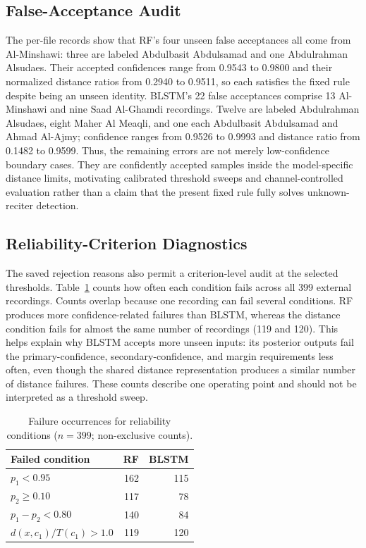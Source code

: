 \documentclass[a4paper,conference]{IEEEtran}
\begin{document}
\subsection{False-Acceptance Audit}

The per-file records show that RF's four unseen false acceptances all come from Al-Minshawi: three are labeled Abdulbasit Abdulsamad and one Abdulrahman Alsudaes. Their accepted confidences range from 0.9543 to 0.9800 and their normalized distance ratios from 0.2940 to 0.9511, so each satisfies the fixed rule despite being an unseen identity. BLSTM's 22 false acceptances comprise 13 Al-Minshawi and nine Saad Al-Ghamdi recordings. Twelve are labeled Abdulrahman Alsudaes, eight Maher Al Meaqli, and one each Abdulbasit Abdulsamad and Ahmad Al-Ajmy; confidence ranges from 0.9526 to 0.9993 and distance ratio from 0.1482 to 0.9599. Thus, the remaining errors are not merely low-confidence boundary cases. They are confidently accepted samples inside the model-specific distance limits, motivating calibrated threshold sweeps and channel-controlled evaluation rather than a claim that the present fixed rule fully solves unknown-reciter detection.

\subsection{Reliability-Criterion Diagnostics}

The saved rejection reasons also permit a criterion-level audit at the selected thresholds. Table~\ref{table_failures} counts how often each condition fails across all 399 external recordings. Counts overlap because one recording can fail several conditions. RF produces more confidence-related failures than BLSTM, whereas the distance condition fails for almost the same number of recordings (119 and 120). This helps explain why BLSTM accepts more unseen inputs: its posterior outputs fail the primary-confidence, secondary-confidence, and margin requirements less often, even though the shared distance representation produces a similar number of distance failures. These counts describe one operating point and should not be interpreted as a threshold sweep.

\begin{table}[htbp]
\centering
\caption{Failure occurrences for reliability conditions ($n=399$; non-exclusive counts).}
\label{table_failures}
\renewcommand{\arraystretch}{1.08}
\setlength{\tabcolsep}{4pt}
\begin{tabular}{l r r}
\toprule
\textbf{Failed condition} & \textbf{RF} & \textbf{BLSTM} \\
\midrule
$p_1 < 0.95$ & 162 & 115 \\
$p_2 \geq 0.10$ & 117 & 78 \\
$p_1-p_2 < 0.80$ & 140 & 84 \\
$d(x,c_1)/T(c_1) > 1.0$ & 119 & 120 \\
\bottomrule
\end{tabular}
\end{table}
\end{document}
